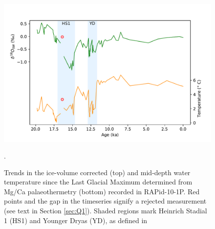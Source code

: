 \begin{figure} \label{eq:timeseries}
\includegraphics[width=\textwidth]{img/timeseries_temp_and_d18Osw.pdf}
    \caption{Trends in the ice-volume corrected  (top) and mid-depth water temperature since the Last Glacial Maximum determined from Mg/Ca palaeothermetry (bottom) recorded in RAPid-10-1P.
             Red points and the gap in the timeseries signify a rejected measurement (see text in Section \ref{sec:Q1}).
             Shaded regions mark Heinrich Stadial 1 (HS1) and Younger Dryas (YD), as defined in \citeauthor{thornalley2011reconstructing} \parencite{thornalley2011reconstructing}}.
        \label{fig:timeseriestempd18Osw}
\end{figure}
